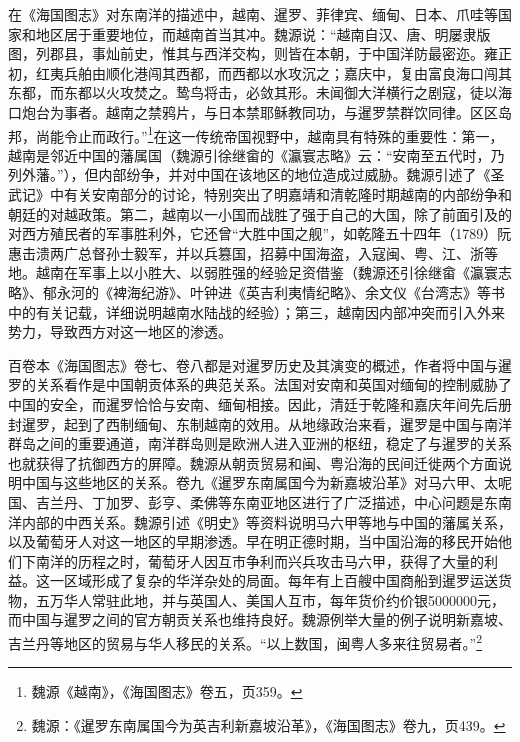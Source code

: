 \documentclass[a4paper, 12pt, openright]{ctexbook}
\begin{document}
在《海国图志》对东南洋的描述中，越南、暹罗、菲律宾、缅甸、日本、爪哇等国家和地区居于重要地位，而越南首当其冲。魏源说：“越南自汉、唐、明屡隶版图，列郡县，事灿前史，惟其与西洋交构，则皆在本朝，于中国洋防最密迩。雍正初，红夷兵舶由顺化港闯其西都，而西都以水攻沉之；嘉庆中，复由富良海口闯其东都，而东都以火攻焚之。鸷鸟将击，必敛其形。未闻御大洋横行之剧寇，徒以海口炮台为事者。越南之禁鸦片，与日本禁耶稣教同功，与暹罗禁群饮同律。区区岛邦，尚能令止而政行。”\footnote{魏源《越南》，《海国图志》卷五，页359。}在这一传统帝国视野中，越南具有特殊的重要性：第一，越南是邻近中国的藩属国（魏源引徐继畲的《瀛寰志略》云：“安南至五代时，乃列外藩。”），但内部纷争，并对中国在该地区的地位造成过威胁。魏源引述了《圣武记》中有关安南部分的讨论，特别突出了明嘉靖和清乾隆时期越南的内部纷争和朝廷的对越政策。第二，越南以一小国而战胜了强于自己的大国，除了前面引及的对西方殖民者的军事胜利外，它还曾“大胜中国之舰”，如乾隆五十四年（1789）阮惠击溃两广总督孙士毅军，并以兵篡国，招募中国海盗，入寇闽、粤、江、浙等地。越南在军事上以小胜大、以弱胜强的经验足资借鉴（魏源还引徐继畲《瀛寰志略》、郁永河的《裨海纪游》、叶钟进《英吉利夷情纪略》、余文仪《台湾志》等书中的有关记载，详细说明越南水陆战的经验）；第三，越南因内部冲突而引入外来势力，导致西方对这一地区的渗透。

百卷本《海国图志》卷七、卷八都是对暹罗历史及其演变的概述，作者将中国与暹罗的关系看作是中国朝贡体系的典范关系。法国对安南和英国对缅甸的控制威胁了中国的安全，而暹罗恰恰与安南、缅甸相接。因此，清廷于乾隆和嘉庆年间先后册封暹罗，起到了西制缅甸、东制越南的效用。从地缘政治来看，暹罗是中国与南洋群岛之间的重要通道，南洋群岛则是欧洲人进入亚洲的枢纽，稳定了与暹罗的关系也就获得了抗御西方的屏障。魏源从朝贡贸易和闽、粤沿海的民间迁徙两个方面说明中国与这些地区的关系。卷九《暹罗东南属国今为新嘉坡沿革》对马六甲、太呢国、吉兰丹、丁加罗、彭亨、柔佛等东南亚地区进行了广泛描述，中心问题是东南洋内部的中西关系。魏源引述《明史》等资料说明马六甲等地与中国的藩属关系，以及葡萄牙人对这一地区的早期渗透。早在明正德时期，当中国沿海的移民开始他们下南洋的历程之时，葡萄牙人因互市争利而兴兵攻击马六甲，获得了大量的利益。这一区域形成了复杂的华洋杂处的局面。每年有上百艘中国商船到暹罗运送货物，五万华人常驻此地，并与英国人、美国人互市，每年货价约价银5000000元，而中国与暹罗之间的官方朝贡关系也维持良好。魏源例举大量的例子说明新嘉坡、吉兰丹等地区的贸易与华人移民的关系。“以上数国，闽粤人多来往贸易者。”\footnote{魏源：《暹罗东南属国今为英吉利新嘉坡沿革》，《海国图志》卷九，页439。}
\end{document}
